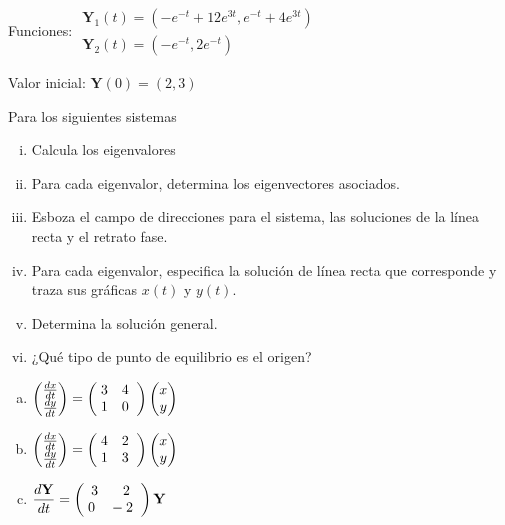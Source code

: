 \documentclass[12pt]{exam}
\newcommand*\colvec[3][]{
    \begin{pmatrix}\ifx\relax#1\relax\else#1\\\fi#2\\#3\end{pmatrix}
}
\begin{document}
\begin{questions}
\begin{enumerate}[a)]
        Funciones: $\begin{matrix}\mathbf{Y}_1(t)=(-e^{-t}+12e^{3t},e^{-t}+4e^{3t})\\\mathbf{Y}_2(t)=(-e^{-t},2e^{-t})\phantom{------}\end{matrix}$
        
        Valor inicial: $\mathbf{Y}(0)=(2,3)$
    \end{enumerate}

     \question%
     Para los siguientes sistemas
     \begin{enumerate}[i)]
         \item Calcula los eigenvalores
         \item Para cada eigenvalor, determina los eigenvectores asociados.
         \item Esboza el campo de direcciones para el sistema, las soluciones de la línea recta y el retrato fase.
         \item Para cada eigenvalor, especifica la solución de línea recta que corresponde y traza sus gráficas $x(t)$ y $y(t)$.
         \item Determina la solución general.
         \item ¿Qué tipo de punto de equilibrio es el origen?
     \end{enumerate}
\vskip 20pt
    
    \begin{enumerate}[a)]
        \item $\colvec{\frac{dx}{dt}}{\frac{dy}{dt}}=\colvec{\;3\quad4\;\;}{\;1\quad0\;\;}\colvec{x}{y}$
        \item $\colvec{\frac{dx}{dt}}{\frac{dy}{dt}}=\colvec{\;4\quad2\;\;}{\;1\quad3\;\;}\colvec{x}{y}$
        \item $\dfrac{d\mathbf{Y}}{dt}=\colvec{\;3\quad\phantom{-}2\;\;}{\;0\quad-2\;\;}\mathbf{Y}$
        
    \end{enumerate}


\end{questions}
\end{document}
